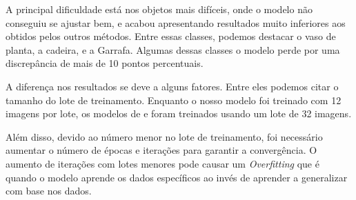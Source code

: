 A principal dificuldade está nos objetos mais difíceis, onde o modelo não conseguiu se ajustar bem, e acabou apresentando resultados muito inferiores aos obtidos pelos outros métodos. Entre essas classes, podemos destacar o vaso de planta, a cadeira, e a Garrafa. Algumas dessas classes o modelo perde por uma discrepância de mais de 10 pontos percentuais.

A diferença nos resultados se deve a alguns fatores. Entre eles podemos citar o tamanho do lote de treinamento. Enquanto o nosso modelo foi treinado com 12 imagens por lote, os modelos de  e  foram treinados usando um lote de 32 imagens. 

Além disso, devido ao número menor no lote de treinamento, foi necessário aumentar o número de épocas e iterações para garantir a convergência. O aumento de iterações com lotes menores pode causar um \textit{Overfitting} que é quando o modelo aprende os dados específicos ao invés de aprender a generalizar com base nos dados.


